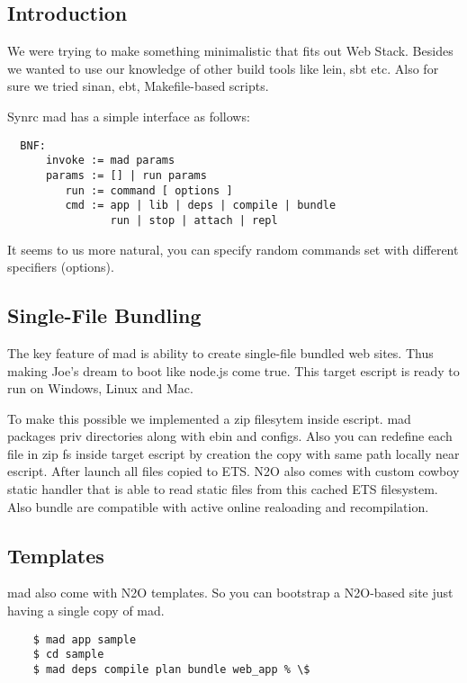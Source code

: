 \subsection{Introduction}

We were trying to make something minimalistic that fits out Web Stack.
Besides we wanted to use our knowledge of other build tools like lein, sbt etc.
Also for sure we tried sinan, ebt, Makefile-based scripts.

Synrc mad has a simple interface as follows:

\vspace{1\baselineskip}
\begin{lstlisting}
  BNF:
      invoke := mad params
      params := [] | run params
         run := command [ options ]
         cmd := app | lib | deps | compile | bundle
                run | stop | attach | repl
\end{lstlisting}
\vspace{1\baselineskip}

It seems to us more natural, you can specify random
commands set with different specifiers (options).

\subsection{Single-File Bundling}

The key feature of mad is ability to create single-file bundled web sites.
Thus making Joe's dream to boot like node.js come true.
This target escript is ready to run on Windows, Linux and Mac.

To make this possible we implemented a zip filesytem inside escript.
mad packages priv directories along with ebin and configs.
Also you can redefine each file in zip fs inside target
escript by creation the copy with same path locally near escript.
After launch all files copied to ETS.
N2O also comes with custom cowboy static handler that is able to
read static files from this cached ETS filesystem.
Also bundle are compatible with active online realoading and recompilation.

\subsection{Templates}

mad also come with N2O templates. So you can bootstrap a N2O-based site
just having a single copy of mad.

\vspace{1\baselineskip}
\begin{lstlisting}
    $ mad app sample
    $ cd sample
    $ mad deps compile plan bundle web_app % \$
\end{lstlisting}
\vspace{1\baselineskip}

